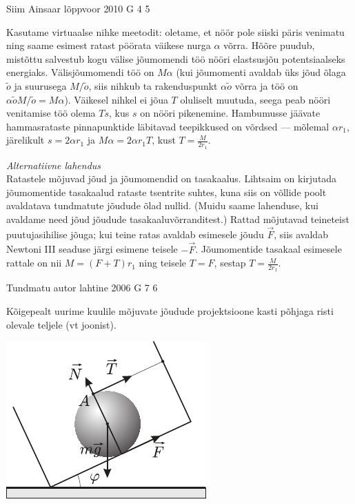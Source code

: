\documentclass[11pt]{article}
\begin{document}
{%
{Siim Ainsaar} %
{lõppvoor} %
{2010} %
{G 4} %
{5} %
{

\ifSolution
Kasutame virtuaalse nihke meetodit: oletame, et nöör pole siiski päris venimatu ning
saame esimest ratast pöörata väikese nurga $\alpha$ võrra. Hõõre puudub,
mistõttu salvestub kogu välise jõumomendi töö nööri elastsusjõu potentsiaalseks
energiaks. Välisjõumomendi töö on $M \alpha$ (kui jõumomenti avaldab üks jõud
õlaga $\tilde o$ ja suurusega $M / \tilde o$, siis nihkub ta rakenduspunkt $\alpha
\tilde o$ võrra ja töö on $\alpha \tilde o M / \tilde o = M \alpha$). Väikesel
nihkel ei jõua $T$ oluliselt muutuda, seega peab nööri venitamise töö olema $T
s$, kus $s$ on nööri pikenemine. Hambumusse jäävate hammasrataste pinnapunktide
läbitavad teepikkused on võrdsed --- mõlemal $\alpha r_1$, järelikult $s = 2
\alpha r_1$ ja $M \alpha = 2 \alpha r_1 T$, kust $T = \frac{M}{2 r_1}$.

\vspace{0.5\baselineskip}
\textit{Alternatiivne lahendus}\\
Ratastele mõjuvad jõud ja jõumomendid on tasakaalus. Lihtsaim on kirjutada
jõumomentide tasakaalud rataste tsentrite suhtes, kuna siis on võllide poolt
avaldatava tundmatute jõudude õlad nullid. (Muidu saame lahenduse, kui avaldame
need jõud jõudude tasakaaluvõrranditest.) Rattad mõjutavad teineteist
puutujasihilise jõuga; kui teine ratas avaldab esimesele jõudu $\vec F$, siis
avaldab Newtoni III seaduse järgi esimene teisele $-\vec F$. Jõumomentide
tasakaal esimesele rattale on nii $M = (F+T) r_1$ ning teisele $T=F$, sestap
$T = \frac{M}{2 r_1}$.
\fi
}

{Tundmatu autor} %
{lahtine} %
{2006} %
{G 7} %
{6} %
{

\ifSolution
Kõigepealt uurime kuulile mõjuvate jõudude projektsioone kasti põhjaga risti olevale teljele (vt joonist).

\begin{center}
	\includegraphics[width=0.5\linewidth]{2006-lahg-07-lah}
\end{center}

}}
\end{document}

